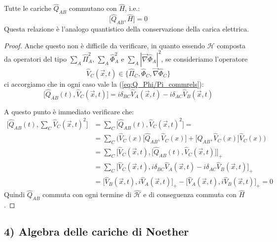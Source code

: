 \documentclass[../main.tex]{subfiles}
\begin{document}
Tutte le cariche $\hat{Q}_{AB}$ commutano con $\hat{H}$, i.e.:
\begin{equation}
    \boxed{\big[ \hat{Q}_{AB}, \hat{H}\big] = 0}
    \label{eq:Q_H_commrels}
\end{equation}
Questa relazione è l'analogo quantistico della conservazione della carica elettrica.
\begin{proof}
    Anche questo non è difficile da verificare, in quanto essendo $\mathscr{H}$ composta da operatori del tipo \(\sum_A\hat{\Pi}_{A}^2\), \(\sum_A\hat{\Phi}_{A}^2\) e \(\sum_A|\Vec{\nabla}\hat{\Phi}_{A}|^2\), se consideriamo l'operatore
    \[
    \hat{V}_C(\Vec{x},t) \in \Big\{ \hat{\Pi}_{C}, \hat{\Phi}_{C}, \Vec{\nabla}\hat{\Phi}_{C} \Big\}
    \]
    ci accorgiamo che in ogni caso  vale la (\ref{eq:Q_Phi/Pi_commrels}):
    \[
    \big[ \hat{Q}_{AB}(t), \hat{V}_C(\Vec{x}, t) \big] = i\delta_{BC}\hat{V}_A(\Vec{x}, t) - i\delta_{AC}\hat{V}_B(\Vec{x}, t)
    \]

    A questo punto è immediato verificare che:
    \begin{align*}
        \big[ \hat{Q}_{AB}(t), \sum_C \hat{V}_C(\Vec{x}, t)^2 \big] &= \sum_C\big[ \hat{Q}_{AB}(t), \hat{V}_C(\Vec{x}, t)^2 \big] =\\
        &=\sum_C \Big(\hat{V}_C(x)\big[ \hat{Q}_{AB}, \hat{V}_C(x) \big] + \big[ \hat{Q}_{AB}, \hat{V}_C(x) \big] \hat{V}_C(x)\Big)\\
        &=\sum_C \Big[ \hat{V}_C(\Vec{x}, t), \big[ \hat{Q}_{AB}(t), \hat{V}_C(\Vec{x}, t) \big] \Big]_+\\
        &= \sum_C \big[ \hat{V}_C(\Vec{x}, t), i\delta_{BC}\hat{V}_A(\Vec{x}, t) - i\delta_{AC}\hat{V}_B(\Vec{x}, t)\big]_+\\
        &= \big[ \hat{V}_B(\Vec{x}, t), i\hat{V}_A(\Vec{x}, t)\big]_+ - \big[ \hat{V}_A(\Vec{x}, t), i\hat{V}_B(\Vec{x}, t)\big]_+ = 0
    \end{align*}
    Quindi $\hat{Q}_{AB}$ commuta con ogni termine di $\hat{\mathscr{H}}$ e di conseguenza commuta con $\hat{H}$.
\end{proof}

\subsection[Algebra delle $\hat{Q}_{AB}$]{4) Algebra delle cariche di Noether}
\end{document}
